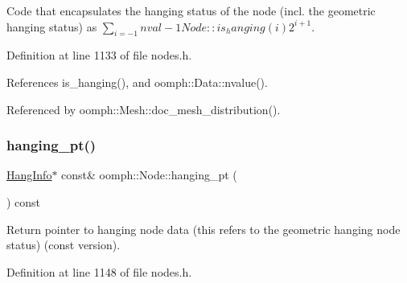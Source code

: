 Code that encapsulates the hanging status of the node (incl. the geometric hanging status) as $ \sum_{i=-1}{nval-1} Node::is_hanging(i) 2^{i+1} $. 



Definition at line 1133 of file nodes.\+h.



References is\+\_\+hanging(), and oomph\+::\+Data\+::nvalue().



Referenced by oomph\+::\+Mesh\+::doc\+\_\+mesh\+\_\+distribution().

\mbox{\label{classoomph_1_1Node_a09e3993064a98e7986f392fd5b239603}} 
\subsubsection{\texorpdfstring{hanging\+\_\+pt()}{hanging\_pt()}\hspace{0.1cm}{\footnotesize\ttfamily [1/2]}}
{\footnotesize\ttfamily \hyperlink{classoomph_1_1HangInfo}{Hang\+Info}$\ast$ const\& oomph\+::\+Node\+::hanging\+\_\+pt (\begin{DoxyParamCaption}{ }\end{DoxyParamCaption}) const\hspace{0.3cm}{\ttfamily [inline]}}



Return pointer to hanging node data (this refers to the geometric hanging node status) (const version). 



Definition at line 1148 of file nodes.\+h.



